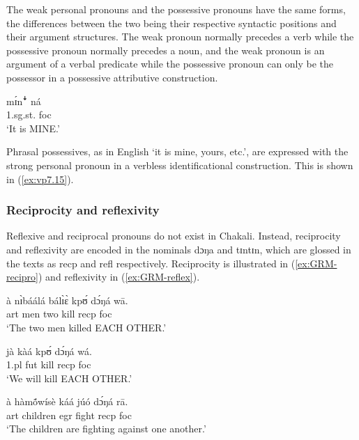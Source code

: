 \begin{exe}
\begin{exe}
\begin{exe}
{\begin{exe}
\begin{exe}
\begin{exe}
\begin{exe}
\begin{exe}
\begin{exe}
\begin{exe}
The  weak personal pronouns and the possessive pronouns have the same forms, the
differences between the two being their respective syntactic positions and their
argument structures. The weak pronoun normally precedes a verb while the
possessive pronoun normally precedes a noun, and the weak pronoun is an
argument of a verbal predicate while the possessive pronoun can only be the
possessor in a possessive attributive construction. 


\ea\label{ex:vp7.15}
\gll                
{mɪ́n{\T ꜜ} ná}\\
{\sc 1.sg.st.} {\sc foc}\\

\glt  `It is MINE.' 
\z


Phrasal possessives, as in English `it is mine, yours, etc.', are expressed with the
strong personal pronoun  in a verbless identificational
construction. This is shown in (\ref{ex:vp7.15}).


\subsubsection{Reciprocity and reflexivity}
\label{sec:GRM-recipro-reflex}


Reflexive and reciprocal pronouns do not exist in Chakali.  Instead,
reciprocity and reflexivity  are
encoded in  the nominals {\sls dɔŋa}   and {\sls tɪntɪn}, which are glossed in 
the
texts as {\sc recp}  and {\sc refl} respectively.   Reciprocity is illustrated 
in
(\ref{ex:GRM-recipro}) and reflexivity in (\ref{ex:GRM-reflex}). 



  \ea\label{ex:GRM-recipro}
   
   
\ea\label{ex:vp24.1.}
\gll à nɪ̀báálá bálɪ̀ɛ̀ kpʊ́ dɔ́ŋá wā.\\
  {\sc art} men two kill {\sc recp}  {\sc foc}\\
\glt  `The two men killed EACH OTHER.' 

\ex\label{ex:vp24.2.}
\gll jà kàá kpʊ́ dɔ́ŋá wá.\\
   {\sc 1.pl} {\sc fut} kill  {\sc recp}   {\sc foc}\\
\glt  `We will kill  EACH OTHER.' 

\ex\label{ex:vp24.3.}
\gll à hàmṍwísè káá júó dɔ́ŋá rā.\\
  {\sc art} children {\sc  egr} fight {\sc recp}  {\sc foc}\\
\glt  `The children are fighting against one another.' 
 

\end{exe}
\end{exe}
\end{exe}
\end{exe}
\end{exe}
\end{exe}
\end{exe}}
\end{exe}
\end{exe}
\end{exe}
